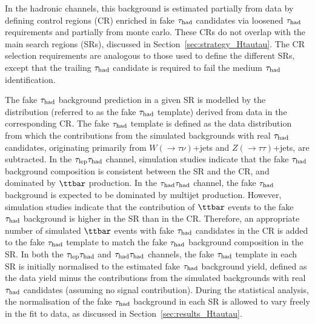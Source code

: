 In the hadronic channels, this background is estimated partially from data by defining control regions (CR) enriched in fake $\tau_{\mathrm{had}}$ candidates via loosened $\tau_{\mathrm{had}}$ requirements and partially from monte carlo. These CRs do not overlap with the main search regions (SRs), discussed in Section~\ref{sec:strategy_Htautau}. The CR selection requirements are analogous to those used to define the different SRs, except that the trailing $\tau_{\mathrm{had}}$ candidate is required to fail the medium $\tau_{\mathrm{had}}$ identification.

The fake $\tau_{\mathrm{had}}$ background prediction in a given SR is modelled by the distribution (referred to as the fake $\tau_{\mathrm{had}}$ template) derived from data in the corresponding CR. The fake $\tau_{\mathrm{had}}$ template is defined as the data distribution from which the contributions from the simulated backgrounds with real $\tau_{\mathrm{had}}$ candidates, originating primarily from 
$W(\to \tau\nu)$+jets and $Z(\to \tau\tau)$+jets, are subtracted. In the $\tau_{\mathrm{lep}} \tau_{\mathrm{had}}$ channel, simulation studies indicate that the fake $\tau_{\mathrm{had}}$ background composition is consistent between the SR and the CR, and dominated by $\ttbar$ production. In the $\tau_{\mathrm{had}} \tau_{\mathrm{had}}$ channel, the fake $\tau_{\mathrm{had}}$ background is expected to be dominated by multijet production. However, simulation studies indicate that the contribution of $\ttbar$ events to the fake $\tau_{\mathrm{had}}$ background is higher in the SR than in the CR. Therefore, an appropriate number of simulated $\ttbar$ events with fake $\tau_{\mathrm{had}}$ candidates in the CR is added to the fake $\tau_{\mathrm{had}}$ template to match the fake $\tau_{\mathrm{had}}$ background composition in the SR. 
In both the $\tau_{\mathrm{lep}} \tau_{\mathrm{had}}$ and $\tau_{\mathrm{had}} \tau_{\mathrm{had}}$ channels, the fake $\tau_{\mathrm{had}}$ template in each SR is initially normalised to the estimated fake $\tau_{\mathrm{had}}$ background yield, 
defined as the data yield minus the contributions from the simulated backgrounds with real $\tau_{\mathrm{had}}$ candidates (assuming no signal contribution).
During the statistical analysis, the normalisation of the fake $\tau_{\mathrm{had}}$ background in each SR is allowed to vary freely in the fit to data, as discussed in Section~\ref{sec:results_Htautau}.